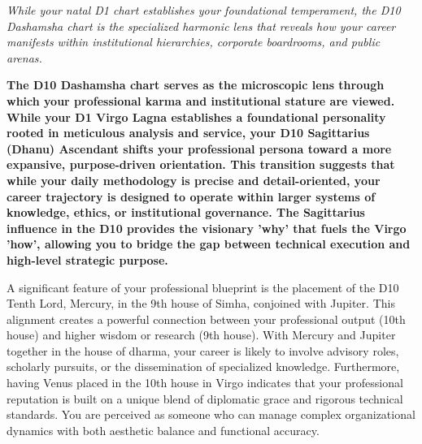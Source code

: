 


{\fontsize{9.5}{14}\selectfont\color{DeepSlate}\itshape While your natal D1 chart establishes your foundational temperament, the D10 Dashamsha chart is the specialized harmonic lens that reveals how your career manifests within institutional hierarchies, corporate boardrooms, and public arenas.}\par\vspace{3.5mm}

\label{topic25}

{\fontsize{9.5}{13.8}\selectfont\bfseries\color{DeepSlate} The D10 Dashamsha chart serves as the microscopic lens through which your professional karma and institutional stature are viewed. While your D1 Virgo Lagna establishes a foundational personality rooted in meticulous analysis and service, your D10 Sagittarius (Dhanu) Ascendant shifts your professional persona toward a more expansive, purpose-driven orientation. This transition suggests that while your daily methodology is precise and detail-oriented, your career trajectory is designed to operate within larger systems of knowledge, ethics, or institutional governance. The Sagittarius influence in the D10 provides the visionary 'why' that fuels the Virgo 'how', allowing you to bridge the gap between technical execution and high-level strategic purpose.}\par\vspace{2mm}

{\fontsize{9}{13}\selectfont A significant feature of your professional blueprint is the placement of the D10 Tenth Lord, Mercury, in the 9th house of Simha, conjoined with Jupiter. This alignment creates a powerful connection between your professional output (10th house) and higher wisdom or research (9th house). With Mercury and Jupiter together in the house of dharma, your career is likely to involve advisory roles, scholarly pursuits, or the dissemination of specialized knowledge. Furthermore, having Venus placed in the 10th house in Virgo indicates that your professional reputation is built on a unique blend of diplomatic grace and rigorous technical standards. You are perceived as someone who can manage complex organizational dynamics with both aesthetic balance and functional accuracy.}\par\vspace{1.8mm}

